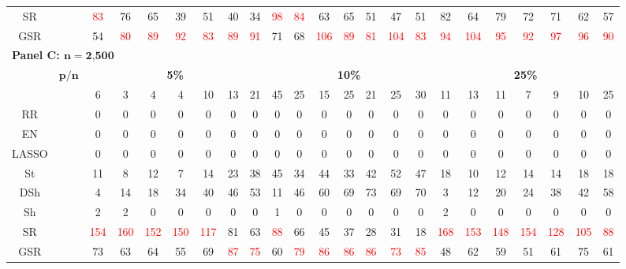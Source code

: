 \begin{table}
{\begin{tabular*}{\textwidth}{@{\extracolsep{\fill}}cc|ccccccc|ccccccc|ccccccc@{}}
SR &  & \textcolor{red}{83} & 76 & 65 & 39 & 51 & 40 & 34 & \textcolor{red}{98} & \textcolor{red}{84} & 63 & 65 & 51 & 47 & 51 & 82 & 64 & 79 & 72 & 71 & 62 & 57 \\
GSR &  & 54 & \textcolor{red}{80} & \textcolor{red}{89} & \textcolor{red}{92} & \textcolor{red}{83} & \textcolor{red}{89} & \textcolor{red}{91} & 71 & 68 & \textcolor{red}{106} & \textcolor{red}{89} & \textcolor{red}{81} & \textcolor{red}{104} & \textcolor{red}{83} & \textcolor{red}{94} & \textcolor{red}{104} & \textcolor{red}{95} & \textcolor{red}{92} & \textcolor{red}{97} & \textcolor{red}{96} & \textcolor{red}{90} \\
\hline
\multicolumn{23}{l}{\textbf{Panel C: $\bm{n}=\textbf{2,500}$}} \\
\hline
\multirow{2}{*}{} & $\bm{p/n}$ & \multicolumn{7}{c|}{\textbf{5\%}} & \multicolumn{7}{c|}{\textbf{10\%}} & \multicolumn{7}{c}{\textbf{25\%}} \\
\hline
OLS &  & 6 & 3 & 4 & 4 & 10 & 13 & 21 & 45 & 25 & 15 & 25 & 21 & 25 & 30 & 11 & 13 & 11 & 7 & 9 & 10 & 25 \\
RR &  & 0 & 0 & 0 & 0 & 0 & 0 & 0 & 0 & 0 & 0 & 0 & 0 & 0 & 0 & 0 & 0 & 0 & 0 & 0 & 0 & 0 \\
EN &  & 0 & 0 & 0 & 0 & 0 & 0 & 0 & 0 & 0 & 0 & 0 & 0 & 0 & 0 & 0 & 0 & 0 & 0 & 0 & 0 & 0 \\
LASSO &  & 0 & 0 & 0 & 0 & 0 & 0 & 0 & 0 & 0 & 0 & 0 & 0 & 0 & 0 & 0 & 0 & 0 & 0 & 0 & 0 & 0 \\
St &  & 11 & 8 & 12 & 7 & 14 & 23 & 38 & 45 & 34 & 44 & 33 & 42 & 52 & 47 & 18 & 10 & 12 & 14 & 14 & 18 & 18 \\
DSh &  & 4 & 14 & 18 & 34 & 40 & 46 & 53 & 11 & 46 & 60 & 69 & 73 & 69 & 70 & 3 & 12 & 20 & 24 & 38 & 42 & 58 \\
Sh &  & 2 & 2 & 0 & 0 & 0 & 0 & 0 & 1 & 0 & 0 & 0 & 0 & 0 & 0 & 2 & 0 & 0 & 0 & 0 & 0 & 0 \\
SR &  & \textcolor{red}{154} & \textcolor{red}{160} & \textcolor{red}{152} & \textcolor{red}{150} & \textcolor{red}{117} & 81 & 63 & \textcolor{red}{88} & 66 & 45 & 37 & 28 & 31 & 18 & \textcolor{red}{168} & \textcolor{red}{153} & \textcolor{red}{148} & \textcolor{red}{154} & \textcolor{red}{128} & \textcolor{red}{105} & \textcolor{red}{88} \\
GSR &  & 73 & 63 & 64 & 55 & 69 & \textcolor{red}{87} & \textcolor{red}{75} & 60 & \textcolor{red}{79} & \textcolor{red}{86} & \textcolor{red}{86} & \textcolor{red}{86} & \textcolor{red}{73} & \textcolor{red}{85} & 48 & 62 & 59 & 51 & 61 & 75 & 61 \\

\end{tabular*}}
\end{table}

